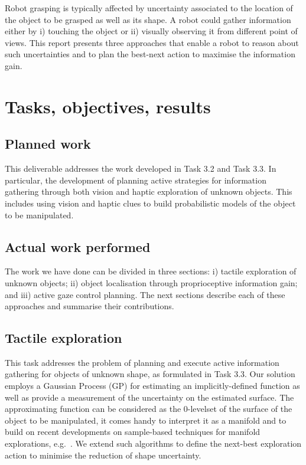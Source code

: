 \documentclass[a4paper,11pt,pdf]{../templates/pacmanreport}
\begin{document}
Robot grasping is typically affected by uncertainty associated to the location of the object to be grasped as well as its shape. 
A robot could gather information either by i) touching the object or ii) visually observing it from different point of views. 
This report presents three approaches that enable a robot to reason about such uncertainties and to plan the best-next action to maximise the information gain.

\newpage

\section{Tasks, objectives, results}

\subsection{Planned work}

This deliverable addresses the work developed in Task 3.2 and Task 3.3.
In particular, the development of planning active strategies for information gathering through both vision and 
haptic exploration of unknown objects. 
This includes using vision and haptic clues to build probabilistic models of the object to be manipulated.   

\subsection{Actual work performed}

The work we have done can be divided in three sections: i) tactile exploration of unknown objects; ii) object localisation through proprioceptive information gain; and iii) active gaze control planning. The next sections describe each of these approaches and summarise their contributions.

\subsection{Tactile exploration}

This task addresses the problem of planning and execute active information gathering for objects of unknown shape, as formulated in Task 3.3. Our solution employs a Gaussian Process (GP) for estimating an implicitly-defined function as well as provide a measurement of the uncertainty on the estimated surface. The approximating function can be considered as the 0-levelset of the surface of the object to be manipulated, it comes handy to interpret it as a manifold and to build on recent developments on sample-based techniques for manifold explorations, e.g.~\cite{Jaillet2013Path}. We extend such algorithms to define the next-best exploration action to minimise the reduction of shape uncertainty. 
\end{document}
